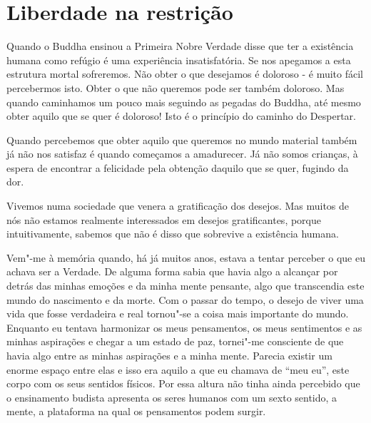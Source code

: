 \chapter{Liberdade na restrição}

Quando o Buddha ensinou a Primeira Nobre Verdade disse que ter a
existência humana como refúgio é uma experiência insatisfatória. Se nos
apegamos a esta estrutura mortal sofreremos. Não obter o que desejamos é
doloroso - é muito fácil percebermos isto. Obter o que não queremos pode
ser também doloroso. Mas quando caminhamos um pouco mais seguindo as
pegadas do Buddha, até mesmo obter aquilo que se quer é doloroso! Isto é
o princípio do caminho do Despertar.

Quando percebemos que obter aquilo que queremos no mundo material também
já não nos satisfaz é quando começamos a amadurecer. Já não somos
crianças, à espera de encontrar a felicidade pela obtenção daquilo que
se quer, fugindo da dor.

Vivemos numa sociedade que venera a gratificação dos desejos. Mas muitos
de nós não estamos realmente interessados em desejos gratificantes,
porque intuitivamente, sabemos que não é disso que sobrevive a
existência humana.

Vem"-me à memória quando, há já muitos anos, estava a tentar perceber o
que eu achava ser a Verdade. De alguma forma sabia que havia algo a
alcançar por detrás das minhas emoções e da minha mente pensante, algo
que transcendia este mundo do nascimento e da morte. Com o passar do
tempo, o desejo de viver uma vida que fosse verdadeira e real tornou"-se
a coisa mais importante do mundo. Enquanto eu tentava harmonizar os meus
pensamentos, os meus sentimentos e as minhas aspirações e chegar a um
estado de paz, tornei"-me consciente de que havia algo entre as minhas
aspirações e a minha mente. Parecia existir um enorme espaço entre elas
e isso era aquilo a que eu chamava de ``meu eu'', este corpo com os seus
sentidos físicos. Por essa altura não tinha ainda percebido que o
ensinamento budista apresenta os seres humanos com um sexto sentido, a
mente, a plataforma na qual os pensamentos podem surgir.

